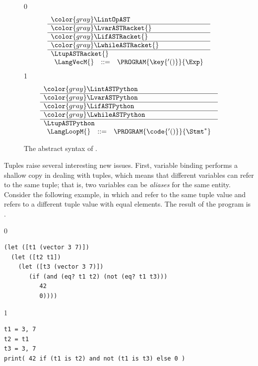 \documentclass[7x10]{TimesAPriori_MIT}%
\newcommand{\gray}[1]{{\color{gray} #1}}
\def\racketEd{0}
\def\pythonEd{1}
\def\edition{1}
\newcommand{\pythonColor}[0]{}
\numberwithin{theorem}{chapter}
\numberwithin{definition}{chapter}
\numberwithin{equation}{chapter}
\begin{document}
\begin{figure}[tp]
\centering
\begin{tcolorbox}[colback=white]
    \small
{\if\edition\racketEd    
\[
\begin{array}{l}
  \gray{\LintOpAST} \\ \hline
  \gray{\LvarASTRacket{}} \\ \hline
  \gray{\LifASTRacket{}} \\ \hline
  \gray{\LwhileASTRacket{}} \\ \hline
  \LtupASTRacket{} \\
\begin{array}{lcl}
  \LangVecM{} &::=& \PROGRAM{\key{'()}}{\Exp}
\end{array}
\end{array}
\]
\fi}
{\if\edition\pythonEd\pythonColor
\[
\begin{array}{l}
  \gray{\LintASTPython} \\ \hline
  \gray{\LvarASTPython} \\ \hline
  \gray{\LifASTPython} \\ \hline
  \gray{\LwhileASTPython} \\ \hline
  \LtupASTPython \\
  \begin{array}{lcl}
    \LangLoopM{} &::=& \PROGRAM{\code{'()}}{\Stmt^{*}}
  \end{array}
\end{array}
\]
\fi}
\end{tcolorbox}

\caption{The abstract syntax of \LangVec{}.}
\label{fig:Lvec-syntax}
\end{figure}

Tuples raise several interesting new issues.  First, variable binding
performs a shallow copy in dealing with tuples, which means that
different variables can refer to the same tuple; that is, two
variables can be \emph{aliases} for the same
entity. Consider the following example, in which  and
 refer to the same tuple value and  refers to a
different tuple value with equal elements. The result of the
program is .


\begin{center}
\begin{minipage}{0.96\textwidth}
{\if\edition\racketEd        
\begin{lstlisting}
(let ([t1 (vector 3 7)])
  (let ([t2 t1])
    (let ([t3 (vector 3 7)])
       (if (and (eq? t1 t2) (not (eq? t1 t3)))
          42
          0))))
\end{lstlisting}
\fi}
{\if\edition\pythonEd\pythonColor
\begin{lstlisting}
t1 = 3, 7
t2 = t1
t3 = 3, 7
print( 42 if (t1 is t2) and not (t1 is t3) else 0 )
\end{lstlisting}
\fi}
\end{minipage}
\end{center}
\end{document}
